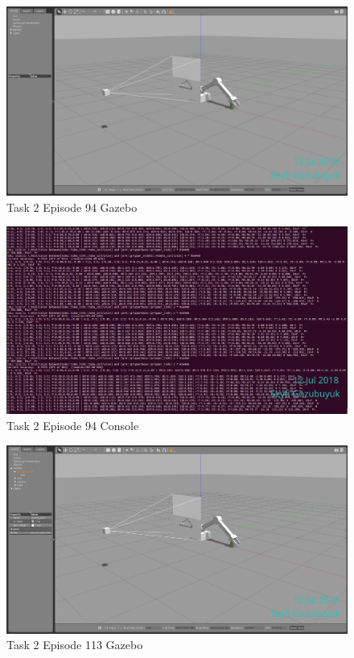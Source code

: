 \documentclass[10pt,journal,compsoc]{IEEEtran}
\begin{document}
\begin{figure}[thpb]
      \centering
      \includegraphics[width=\linewidth]{figures/Task2_Step94_1.png}
      \caption{Task 2 Episode 94 Gazebo}
      \label{fig:t2s941}
\end{figure}

\begin{figure}[thpb]
      \centering
      \includegraphics[width=\linewidth]{figures/Task2_Step94_2.png}
      \caption{Task 2 Episode 94 Console}
      \label{fig:t2s942}
\end{figure}

\begin{figure}[thpb]
      \centering
      \includegraphics[width=\linewidth]{figures/Task2_Step113_1.png}
      \caption{Task 2 Episode 113 Gazebo}
      \label{fig:t2s1131}
\end{figure}
\end{document}
